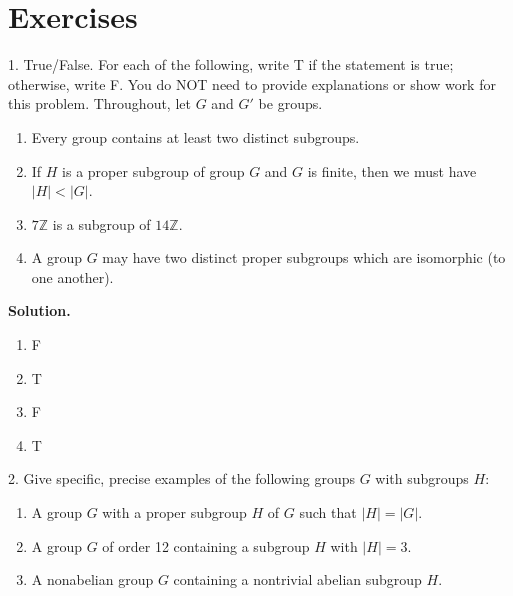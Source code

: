 \documentclass[10pt,]{book}
\theoremstyle{plain}
\theoremstyle{definition}
\theoremstyle{definition}
\theoremstyle{definition}
\theoremstyle{definition}
\numberwithin{equation}{section}
\def\Z{\mathbb{Z}}
\newcommand{\lt}{<}
\begin{document}
\section[{Exercises}]{Exercises}\label{exercises-5}
\begin{exerciselist}
\item[1.]\hypertarget{exercise-28}{}True/False. For each of the following, write T if the statement is true; otherwise, write F. You do NOT need to provide explanations or show work for this problem. Throughout, let \(G\) and \(G'\) be groups. \leavevmode%
\begin{enumerate}[label=(\alph*)]
\item\hypertarget{li-213}{}Every group contains at least two distinct subgroups.%
\item\hypertarget{li-214}{}If \(H\) is a proper subgroup of group \(G\) and \(G\) is finite, then we must have \(|H|\lt |G|\).%
\item\hypertarget{li-215}{}\(7\Z\) is a subgroup of \(14\Z\).%
\item\hypertarget{li-216}{}A group \(G\) may have two distinct proper subgroups which are isomorphic (to one another).%
\end{enumerate}
%
\par\smallskip
\par\smallskip
\noindent\textbf{Solution.}\hypertarget{solution-28}{}\quad
\leavevmode%
\begin{multicols}{4}
\begin{enumerate}[label=(\alph*)]
\item\hypertarget{li-217}{}F%
\item\hypertarget{li-218}{}T%
\item\hypertarget{li-219}{}F%
\item\hypertarget{li-220}{}T%
\end{enumerate}
\end{multicols}
%
\item[2.]\hypertarget{exercise-29}{}Give specific, precise examples of the following groups \(G\) with subgroups \(H\): \leavevmode%
\begin{enumerate}[label=(\alph*)]
\item\hypertarget{li-221}{}A group \(G\) with a proper subgroup \(H\) of \(G\) such that \(|H|=|G|\).%
\item\hypertarget{li-222}{}A group \(G\) of order 12 containing a subgroup \(H\) with \(|H|=3\).%
\item\hypertarget{li-223}{}A nonabelian group \(G\) containing a nontrivial abelian subgroup \(H\).%

\end{enumerate}
\end{exerciselist}
\end{document}
